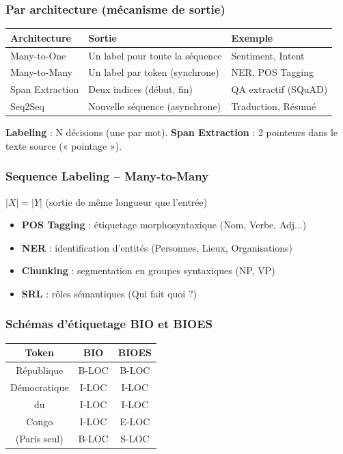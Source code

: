 \documentclass[a4paper,10pt]{article}
\begin{document}
\subsubsection{Par architecture (mécanisme de sortie)}
\begin{center}
\begin{tabularx}{\linewidth}{lXl}
\toprule
\textbf{Architecture} & \textbf{Sortie} & \textbf{Exemple} \\
\midrule
Many-to-One & Un label pour toute la séquence & Sentiment, Intent \\
Many-to-Many & Un label par token (synchrone) & NER, POS Tagging \\
Span Extraction & Deux indices (début, fin) & QA extractif (SQuAD) \\
Seq2Seq & Nouvelle séquence (asynchrone) & Traduction, Résumé \\
\bottomrule
\end{tabularx}
\end{center}

\begin{keybox}
\textbf{Labeling} : N décisions (une par mot). \textbf{Span Extraction} : 2 pointeurs dans le texte source (« pointage »).
\end{keybox}

\subsubsection{Sequence Labeling -- Many-to-Many}
$|X| = |Y|$ (sortie de même longueur que l'entrée)
\begin{itemize}
  \item \textbf{POS Tagging} : étiquetage morphosyntaxique (Nom, Verbe, Adj...)
  \item \textbf{NER} : identification d'entités (Personnes, Lieux, Organisations)
  \item \textbf{Chunking} : segmentation en groupes syntaxiques (NP, VP)
  \item \textbf{SRL} : rôles sémantiques (Qui fait quoi ?)
\end{itemize}

\subsubsection{Schémas d'étiquetage BIO et BIOES}
\begin{center}
\begin{tabular}{ccc}
\toprule
\textbf{Token} & \textbf{BIO} & \textbf{BIOES} \\
\midrule
République & B-LOC & B-LOC \\
Démocratique & I-LOC & I-LOC \\
du & I-LOC & I-LOC \\
Congo & I-LOC & E-LOC \\
(Paris seul) & B-LOC & S-LOC \\
\bottomrule
\end{tabular}
\end{center}
\end{document}
